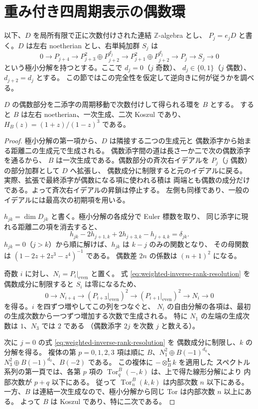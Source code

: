 \section{重み付き四周期表示の偶数環}
\label{sec:weighted-inverse}

以下、$D$ を局所有限で正に次数付けされた連結 $\mathbb Z$-algebra とし、
$P_j=e_jD$ と書く。$D$ は左右 noetherian とし、右単純加群 $S_j$ は
\[
 0\longrightarrow P_{j+4}\longrightarrow
 P_{j+3}^2\oplus P_{j+2}^{d_j}\longrightarrow
 P_{j+1}^2\oplus P_{j+2}^{d_j}\longrightarrow
 P_j\longrightarrow S_j\longrightarrow0
 \tag{*}\label{eq:weighted-inverse-rank-resolution}
\]
という極小分解を持つとする。ここで $d_j=0$（$j$ 奇数）、
$d_j\in\{0,1\}$（$j$ 偶数）、$d_{j+2}=d_j$ とする。
この節ではこの完全性を仮定して逆向きに何が従うかを調べる。

\begin{proposition}
\label{prop:weighted-even-koszul}
$D$ の偶数部分を二添字の周期移動で次数付けして得られる環を $B$ とする。
すると $B$ は左右 noetherian、一次生成、二次 Koszul であり、
$H_B(z)=(1+z)/(1-z)^3$ である。
\end{proposition}

\begin{proof}
極小分解の第一項から、$D$ は隣接する二つの生成元と
偶数添字から始まる距離二の生成元で生成される。
偶数添字間の道は長さ一か二で次の偶数添字を通るから、
$B$ は一次生成である。偶数部分の斉次右イデアルを
$P_j$（$j$ 偶数）の部分加群として $D$ へ拡張し、
偶数成分に制限すると元のイデアルに戻る。
実際、拡張で最終添字が偶数になる項に使われる積は
両端とも偶数の成分だけである。よって斉次右イデアルの昇鎖は停止する。
左側も同様であり、一般のイデアルには最高次の初期項を用いる。

$h_{jk}=\dim D_{jk}$ と書く。極小分解の各成分で Euler 標数を取り、
同じ添字に現れる距離二の項を消去すると、
\[
 h_{jk}-2h_{j+1,k}+2h_{j+3,k}-h_{j+4,k}=\delta_{jk}.
\]
$h_{jk}=0$（$j>k$）から順に解けば、$h_{jk}$ は $k-j$ のみの関数となり、
その母関数は $(1-2z+2z^3-z^4)^{-1}$ である。
偶数差 $2n$ の係数は $(n+1)^2$ になる。

奇数 $i$ に対し、$N_i=P_i|_{\mathrm{even}}$ と置く。
式 \eqref{eq:weighted-inverse-rank-resolution} を偶数成分に制限すると
$S_i$ は零になるため、
\[
 0\to N_{i+4}\to (P_{i+3}|_{\mathrm{even}})^2
   \to(P_{i+1}|_{\mathrm{even}})^2\to N_i\to0
\]
を得る。$i$ を四ずつ増やしてこの列をつなぐと、
$N_i$ の自由分解の各項は、最初の生成次数から一つずつ増加する次数で生成される。
特に $N_1$ の左端の生成次数は $1$、$N_3$ では $2$ である
（偶数添字 $2j$ を次数 $j$ と数える）。

次に $j=0$ の式 \eqref{eq:weighted-inverse-rank-resolution} を
偶数成分に制限し、$k$ の分解を得る。
複体の第 $p=0,1,2,3$ 項は順に
$B$、$N_1^2\oplus B(-1)^{d_0}$、
$N_3^2\oplus B(-1)^{d_0}$、$B(-2)$ である。
この複体に $-\otimes_B^{\mathbf L} k$ を適用した
スペクトル系列の第一頁では、各第 $p$ 項の
$\operatorname{Tor}_q^B(-,k)$ は、上で得た線形分解により
内部次数が $p+q$ 以下にある。
従って $\operatorname{Tor}_n^B(k,k)$ は内部次数 $n$ 以下にある。
一方、$B$ は連結一次生成なので、極小分解から同じ Tor は内部次数 $n$ 以上にある。
よって $B$ は Koszul であり、特に二次である。
\end{proof}

